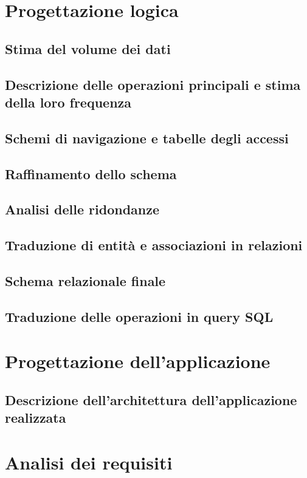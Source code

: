 \documentclass[a4paper,12pt]{report}
\begin{document}
\chapter{Progettazione logica}
\section{Stima del volume dei dati}
\section{Descrizione delle operazioni principali e stima della loro frequenza}
\section{Schemi di navigazione e tabelle degli accessi}
\section{Raffinamento dello schema}
\section{Analisi delle ridondanze}
\section{Traduzione di entità e associazioni in relazioni}
\section{Schema relazionale finale}
\section{Traduzione delle operazioni in query SQL}
\newpage
\chapter{Progettazione dell'applicazione}
\section{Descrizione dell'architettura dell'applicazione realizzata}
\newpage
\chapter{Analisi dei requisiti}
\end{document}
